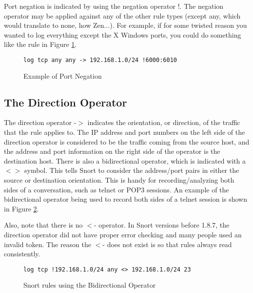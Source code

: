 \documentclass[english]{report}
\begin{document}
Port negation is indicated by using the negation operator !.
The negation operator may be applied against any of the other rule
types (except any, which would translate to none, how Zen...). For
example, if for some twisted reason you wanted to log everything except
the X Windows ports, you could do something like the rule in Figure
\ref{example port negation}.

%
\begin{figure}[!hbpt]
\begin{verbatim}
log tcp any any -> 192.168.1.0/24 !6000:6010
\end{verbatim}

\caption{\label{example port negation}Example of Port Negation}
\end{figure}

\clearpage

\subsection{The Direction Operator}

The direction operator -$>$ indicates the orientation,
or direction, of the traffic that the rule applies
to. The IP address and port numbers on the left side of the direction
operator is considered to be the traffic coming from the source host,
and the address and port information on the right side of the operator
is the destination host. There is also a bidirectional operator, which
is indicated with a $<>$ symbol. This tells Snort
to consider the address/port pairs in either the source or destination
orientation. This is handy for recording/analyzing both sides of a
conversation, such as telnet or POP3 sessions. An example of the bidirectional
operator being used to record both sides of a telnet session is shown
in Figure \ref{bidirectional operator}.

Also, note that there is no $<$- operator. In Snort
versions before 1.8.7, the direction operator did not have proper
error checking and many people used an invalid token. The reason the
$<$- does not exist is so that rules always read
consistently.

%
\begin{figure}[!hbpt]
\begin{verbatim}
log tcp !192.168.1.0/24 any <> 192.168.1.0/24 23
\end{verbatim}

\caption{\label{bidirectional operator}Snort rules using the Bidirectional
Operator}
\end{figure}
\end{document}
